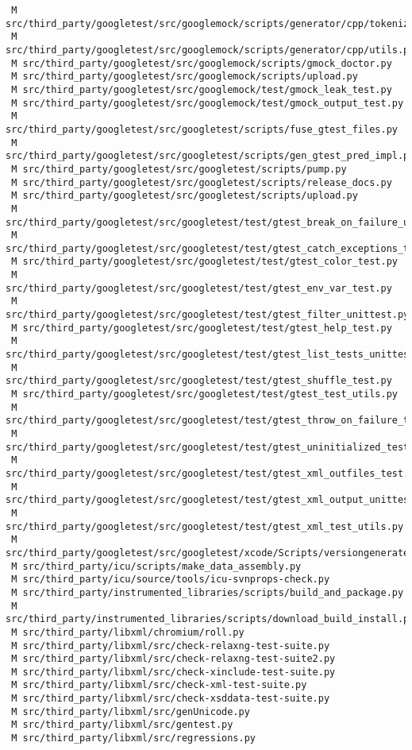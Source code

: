 \documentclass{article}
\begin{document}
\begin{verbatim}
 M src/third_party/googletest/src/googlemock/scripts/generator/cpp/tokenize.py
 M src/third_party/googletest/src/googlemock/scripts/generator/cpp/utils.py
 M src/third_party/googletest/src/googlemock/scripts/gmock_doctor.py
 M src/third_party/googletest/src/googlemock/scripts/upload.py
 M src/third_party/googletest/src/googlemock/test/gmock_leak_test.py
 M src/third_party/googletest/src/googlemock/test/gmock_output_test.py
 M src/third_party/googletest/src/googletest/scripts/fuse_gtest_files.py
 M src/third_party/googletest/src/googletest/scripts/gen_gtest_pred_impl.py
 M src/third_party/googletest/src/googletest/scripts/pump.py
 M src/third_party/googletest/src/googletest/scripts/release_docs.py
 M src/third_party/googletest/src/googletest/scripts/upload.py
 M src/third_party/googletest/src/googletest/test/gtest_break_on_failure_unittest.py
 M src/third_party/googletest/src/googletest/test/gtest_catch_exceptions_test.py
 M src/third_party/googletest/src/googletest/test/gtest_color_test.py
 M src/third_party/googletest/src/googletest/test/gtest_env_var_test.py
 M src/third_party/googletest/src/googletest/test/gtest_filter_unittest.py
 M src/third_party/googletest/src/googletest/test/gtest_help_test.py
 M src/third_party/googletest/src/googletest/test/gtest_list_tests_unittest.py
 M src/third_party/googletest/src/googletest/test/gtest_shuffle_test.py
 M src/third_party/googletest/src/googletest/test/gtest_test_utils.py
 M src/third_party/googletest/src/googletest/test/gtest_throw_on_failure_test.py
 M src/third_party/googletest/src/googletest/test/gtest_uninitialized_test.py
 M src/third_party/googletest/src/googletest/test/gtest_xml_outfiles_test.py
 M src/third_party/googletest/src/googletest/test/gtest_xml_output_unittest.py
 M src/third_party/googletest/src/googletest/test/gtest_xml_test_utils.py
 M src/third_party/googletest/src/googletest/xcode/Scripts/versiongenerate.py
 M src/third_party/icu/scripts/make_data_assembly.py
 M src/third_party/icu/source/tools/icu-svnprops-check.py
 M src/third_party/instrumented_libraries/scripts/build_and_package.py
 M src/third_party/instrumented_libraries/scripts/download_build_install.py
 M src/third_party/libxml/chromium/roll.py
 M src/third_party/libxml/src/check-relaxng-test-suite.py
 M src/third_party/libxml/src/check-relaxng-test-suite2.py
 M src/third_party/libxml/src/check-xinclude-test-suite.py
 M src/third_party/libxml/src/check-xml-test-suite.py
 M src/third_party/libxml/src/check-xsddata-test-suite.py
 M src/third_party/libxml/src/genUnicode.py
 M src/third_party/libxml/src/gentest.py
 M src/third_party/libxml/src/regressions.py

\end{verbatim}
\end{document}
